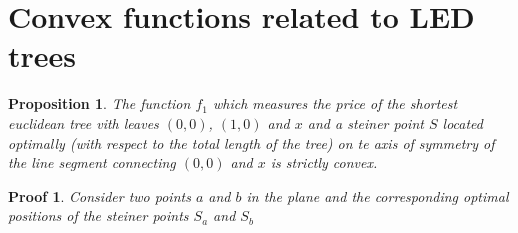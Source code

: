 \documentclass[12pt]{book}
\newtheorem{proposition}{Proposition}
\newtheorem*{pf}{Proof}
\begin{document}
\section{Convex functions related to LED trees}

\begin{proposition}
    The function $f_{1}$ which measures the price of the shortest euclidean
        tree vith leaves $(0,0)$, $(1,0)$ and $x$ and a steiner point $S$
        located optimally (with respect to the total length of the tree) on
        te axis of symmetry of the line segment connecting $(0,0)$ and $x$
        is strictly convex.
\end{proposition}
\begin{pf}
    Consider two points $a$ and $b$ in the plane and the corresponding optimal
        positions of the steiner points $S_{a}$ and $S_{b}$
\end{pf}
\end{document}
